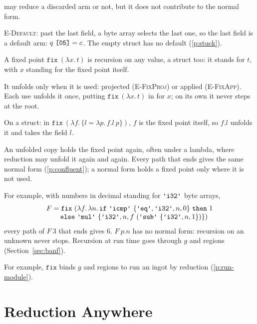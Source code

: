 \documentclass[11pt,letterpaper]{article}
\newcommand{\lam}[2]{\lambda #1.\,#2}       %
\newcommand{\rn}[1]{\textsc{#1}}                %
\newcommand{\kw}[1]{\mathtt{#1}}
\newcommand{\str}[1]{\text{\ttfamily\textquotesingle #1\textquotesingle}}  %
\newcommand{\hex}[1]{\text{\ttfamily [#1]}}  %
\newcounter{pt}
\newcommand{\pref}[1]{\ref{#1}}  %
\begin{document}
\begin{points}
\begin{subpoints}
    may reduce a discarded arm or not, but it does not contribute to the normal form.
  \end{subpoints}
\item \rn{E-Default}: past the last field, a byte array selects the last one, so the last field is
  a default arm: $q\ \hex{05} = c$. The empty struct has no default (\pref{p:stuck}).
\item\label{p:fix} A fixed point $\kw{fix}\ (\lam{x}{t})$ is recursion on any value, a struct
  too: it stands for $t$, with $x$ standing for the fixed point itself.
  \begin{subpoints}
  \item It unfolds only when it is used: projected (\rn{E-FixProj}) or applied (\rn{E-FixApp}).
    Each use unfolds it once, putting $\kw{fix}\ (\lam{x}{t})$ in for $x$; on its own it never
    steps at the root.
  \item On a struct: in $\kw{fix}\ (\lam{f}{\{l = \lam{p}{f.l\ p}\}})$, $f$ is the fixed point
    itself, so $f.l$ unfolds it and takes the field $l$.
  \item An unfolded copy holds the fixed point again, often under a lambda, where reduction may
    unfold it again and again. Every path that ends gives the same
    normal form (\pref{p:confluent}); a normal form holds a fixed point only where it is not used.
  \item For example, with numbers in decimal standing for $\str{i32}$ byte arrays,
    \[\begin{array}{l}F = \kw{fix}\ (\lam{f}{\lam{n}{\kw{if}\ \str{icmp}\ \{\str{eq}, \str{i32}, n, 0\}\ \kw{then}\ 1}} \\
\qquad \kw{else}\ \str{mul}\ \{\str{i32}, n, f\ (\str{sub}\ \{\str{i32}, n, 1\})\})\end{array}\]
    every path of $F\ 3$ that ends gives $6$. $F\ p.n$ has no normal form: recursion on an
    unknown never stops. Recursion at run time goes through $g$ and regions (Section~\ref{sec:banf}).
  \item For example, $\kw{fix}$ binds $g$ and regions to run an ingot by reduction (\pref{p:run-module}).
  \end{subpoints}
\end{points}


\section{Reduction Anywhere}\label{sec:congruence}
\end{document}
